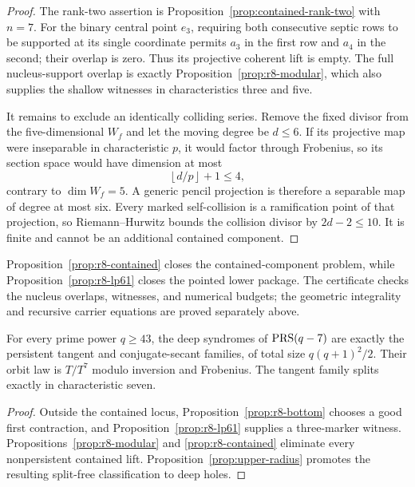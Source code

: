 \begin{proof}
The rank-two assertion is
Proposition~\ref{prop:contained-rank-two} with $n=7$.  For the binary
central point $e_3$, requiring both consecutive septic rows to be
supported at its single coordinate permits $a_3$ in the first row and
$a_4$ in the second; their overlap is zero.  Thus its projective
coherent lift is empty.  The full nucleus-support overlap is exactly
Proposition~\ref{prop:r8-modular}, which also supplies the shallow
witnesses in characteristics three and five.

It remains to exclude an identically colliding series.  Remove the
fixed divisor from the five-dimensional $W_f$ and let the moving
degree be $d\leq6$.  If its projective map were inseparable in
characteristic $p$, it would factor through Frobenius, so its section
space would have dimension at most
\[
 \left\lfloor d/p\right\rfloor+1\leq4,
\]
contrary to $\dim W_f=5$.  A generic pencil projection is therefore a
separable map of degree at most six.  Every marked self-collision is a
ramification point of that projection, so Riemann--Hurwitz bounds the
collision divisor by $2d-2\leq10$.  It is finite and cannot be an
additional contained component.
\end{proof}

\begin{remark}\label{rem:r8-contained}
Proposition~\ref{prop:r8-contained} closes the contained-component
problem, while Proposition~\ref{prop:r8-lp61} closes the pointed lower
package.  The certificate checks the nucleus overlaps, witnesses, and
numerical budgets; the geometric integrality and recursive carrier
equations are proved separately above.
\end{remark}

\begin{theorem}\label{thm:r8}%
%
%
%
%
For every prime power $q\geq43$, the deep
syndromes of $\operatorname{PRS}(q-7)$ are
exactly the persistent tangent and conjugate-secant families, of total
size $q(q+1)^2/2$.  Their orbit law is $T/T^7$ modulo inversion and
Frobenius.  The tangent family splits exactly in characteristic seven.
\end{theorem}

\begin{proof}
Outside the contained locus, Proposition~\ref{prop:r8-bottom} chooses a
good first contraction, and Proposition~\ref{prop:r8-lp61} supplies a
three-marker witness.  Propositions~\ref{prop:r8-modular} and
\ref{prop:r8-contained} eliminate every nonpersistent contained lift.
Proposition~\ref{prop:upper-radius} promotes the resulting split-free
classification to deep holes.
\end{proof}

